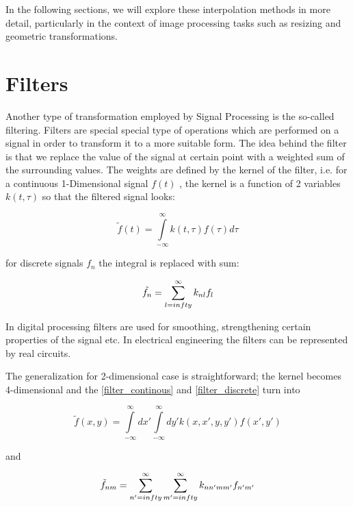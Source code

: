 \documentclass[11pt]{book}
\begin{document}
In the following sections, we will explore these interpolation methods in more detail, particularly in the context of image processing tasks such as resizing and geometric transformations.


\section{Filters}

Another type of transformation employed by Signal Processing is the so-called filtering. Filters are special special type of operations which are performed on a signal in order to transform it to a more suitable form.
The idea behind the filter is that we replace the value of the signal at certain point with a weighted sum of the surrounding values. The weights are defined by the kernel of the filter, i.e. for a continuous 1-Dimensional signal  $f(t)$ , the kernel is a function of 2 variables $k(t,\tau)$ so that the filtered signal looks:

\begin{equation}
\tilde{f}(t) = \int\limits_{-\infty}^\infty k(t,\tau) f(\tau) d\tau\label{filter_continous}
\end{equation}  

for discrete signals $f_n$ the integral is replaced with sum:

\begin{equation}
\tilde{f_n} = \sum\limits_{l=\-infty}^{\infty} k_{nl}f_l\label{filter_discrete}
\end{equation}

In digital processing filters are used for smoothing,  strengthening certain properties of the signal etc. In electrical engineering the filters can be represented by real circuits.

The generalization for 2-dimensional case is straightforward; the kernel becomes 4-dimensional and the \eqref{filter_continous} and \eqref{filter_discrete} turn into

\begin{equation}
\tilde{f}(x,y) = \int\limits_{-\infty}^\infty dx' \int\limits_{-\infty}^\infty dy' k(x,x',y,y') f(x',y')
\end{equation}

and

\begin{equation}
\tilde{f}_{nm} = \sum\limits_{n'=\-infty}^{\infty} \sum\limits_{m'=\-infty}^{\infty} k_{nn'mm'}f_{n'm'}
\end{equation}
\end{document}

